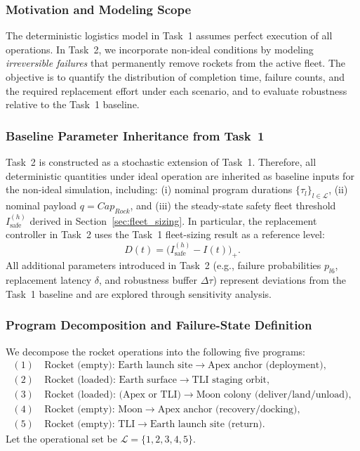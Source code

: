 ﻿\documentclass{mcmthesis}
\begin{document}
\subsubsection{Motivation and Modeling Scope}
\label{sec:model2_scope}

The deterministic logistics model in Task~1 assumes perfect execution of all operations.
In Task~2, we incorporate non-ideal conditions by modeling \emph{irreversible failures} that permanently
remove rockets from the active fleet. The objective is to quantify the distribution of completion time,
failure counts, and the required replacement effort under each scenario, and to evaluate robustness
relative to the Task~1 baseline.

\subsubsection{Baseline Parameter Inheritance from Task~1}
\label{sec:model2_inheritance}

Task~2 is constructed as a stochastic extension of Task~1. Therefore, all deterministic quantities under
ideal operation are inherited as baseline inputs for the non-ideal simulation, including:
(i) nominal program durations $\{\tau_l\}_{l\in\mathcal{L}}$,
(ii) nominal payload $q=Cap_{Rock}$,
and (iii) the steady-state safety fleet threshold $I_{\text{safe}}^{(h)}$ derived in
Section~\ref{sec:fleet_sizing}. In particular, the replacement controller in Task~2 uses the Task~1
fleet-sizing result as a reference level:
\[
D(t)=\big(I_{\text{safe}}^{(h)}-I(t)\big)_+.
\]
All additional parameters introduced in Task~2 (e.g., failure probabilities $p_{l6}$, replacement latency
$\delta$, and robustness buffer $\Delta\tau$) represent deviations from the Task~1 baseline and are explored
through sensitivity analysis.

\subsubsection{Program Decomposition and Failure-State Definition}
\label{sec:model2_programs}

We decompose the rocket operations into the following five programs:
\begin{align*}
(1)\ & \text{Rocket (empty): Earth launch site} \rightarrow \text{Apex anchor (deployment)},\\
(2)\ & \text{Rocket (loaded): Earth surface} \rightarrow \text{TLI staging orbit},\\
(3)\ & \text{Rocket (loaded): (Apex or TLI)} \rightarrow \text{Moon colony (deliver/land/unload)},\\
(4)\ & \text{Rocket (empty): Moon} \rightarrow \text{Apex anchor (recovery/docking)},\\
(5)\ & \text{Rocket (empty): TLI} \rightarrow \text{Earth launch site (return)}.
\end{align*}
Let the operational set be $\mathcal{L}=\{1,2,3,4,5\}$.
\end{document}
